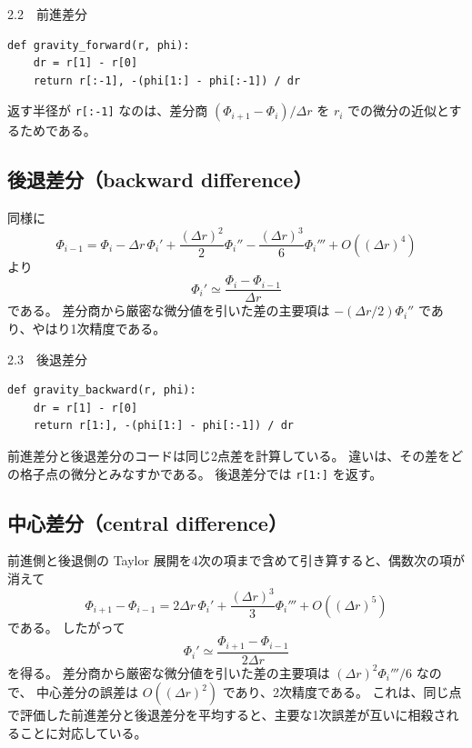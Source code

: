 \begin{listingbox}{2.2　前進差分}
\begin{Verbatim}[fontsize=\small]
def gravity_forward(r, phi):
    dr = r[1] - r[0]
    return r[:-1], -(phi[1:] - phi[:-1]) / dr
\end{Verbatim}
\end{listingbox}

返す半径が \texttt{r[:-1]} なのは、差分商 $(\Phi_{i+1}-\Phi_i)/\Delta r$ を $r_i$ での微分の近似とするためである。

\subsection{後退差分（backward difference）}

同様に
\begin{equation}
 \Phi_{i-1}
 =\Phi_i-\Delta r\,\Phi_i'
 +\frac{(\Delta r)^2}{2}\Phi_i''
 -\frac{(\Delta r)^3}{6}\Phi_i'''
 +O((\Delta r)^4)
\end{equation}
より
\begin{equation}
 \boxed{
 \Phi_i'
 \simeq
 \frac{\Phi_i-\Phi_{i-1}}{\Delta r}
 }
\label{eq:ch2-backward-diff}
\end{equation}
である。
差分商から厳密な微分値を引いた差の主要項は $-(\Delta r/2)\Phi_i''$ であり、やはり1次精度である。

\begin{listingbox}{2.3　後退差分}
\begin{Verbatim}[fontsize=\small]
def gravity_backward(r, phi):
    dr = r[1] - r[0]
    return r[1:], -(phi[1:] - phi[:-1]) / dr
\end{Verbatim}
\end{listingbox}

前進差分と後退差分のコードは同じ2点差を計算している。
違いは、その差をどの格子点の微分とみなすかである。
後退差分では \texttt{r[1:]} を返す。

\subsection{中心差分（central difference）}

前進側と後退側の Taylor 展開を4次の項まで含めて引き算すると、偶数次の項が消えて
\begin{equation}
 \Phi_{i+1}-\Phi_{i-1}
 =2\Delta r\,\Phi_i'
 +\frac{(\Delta r)^3}{3}\Phi_i'''
 +O((\Delta r)^5)
\end{equation}
である。
したがって
\begin{equation}
 \boxed{
 \Phi_i'
 \simeq
 \frac{\Phi_{i+1}-\Phi_{i-1}}{2\Delta r}
 }
\label{eq:ch2-central-diff}
\end{equation}
を得る。
差分商から厳密な微分値を引いた差の主要項は
$(\Delta r)^2\Phi_i'''/6$ なので、
中心差分の誤差は $O((\Delta r)^2)$ であり、2次精度である。
これは、同じ点で評価した前進差分と後退差分を平均すると、主要な1次誤差が互いに相殺されることに対応している。

